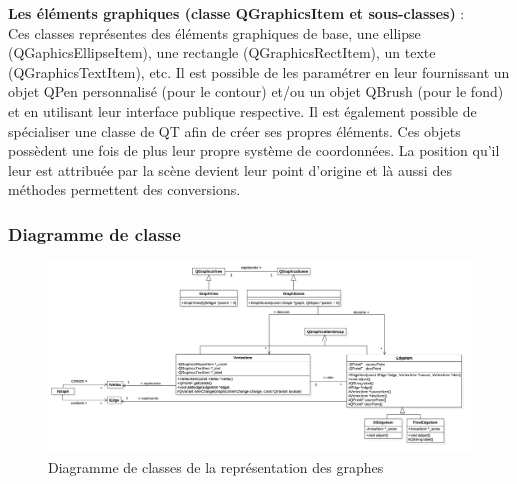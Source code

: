 \documentclass[french]{article}
\begin{document}
				\textbf{Les éléments graphiques (classe QGraphicsItem et sous-classes)} : \\
				Ces classes représentes des éléments graphiques de base, une ellipse (QGaphicsEllipseItem), une rectangle (QGraphicsRectItem), un texte (QGraphicsTextItem), etc. Il est possible de les paramétrer en leur fournissant un objet QPen personnalisé (pour le contour) et/ou un objet QBrush (pour le fond) et en utilisant leur interface publique respective. Il est également possible de spécialiser une classe de QT afin de créer ses propres éléments.
				Ces objets possèdent une fois de plus leur propre système de coordonnées. La position qu'il leur est attribuée par la scène devient leur point d'origine et là aussi des méthodes permettent des conversions.
				
				\pagebreak
				
			\subsubsection{Diagramme de classe}
				\begin{figure}[H]
					\centering
					\includegraphics[width=0.9\textheight,angle=90]{Conception/visualization/visualization.png}
					\caption{Diagramme de classes de la représentation des graphes}
				\end{figure}
				
				\pagebreak
				
\end{document}
